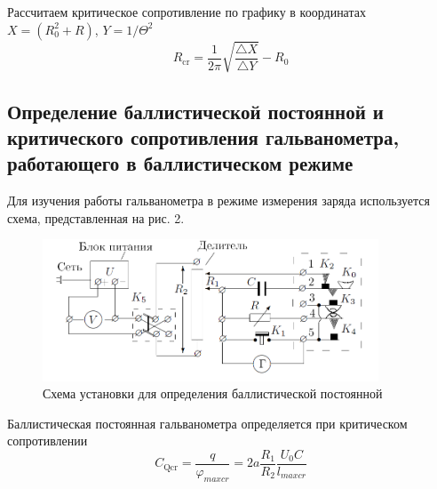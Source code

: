 \documentclass[a4paper]{article}
\begin{document}
Рассчитаем критическое сопротивление по графику в координатах $X = (R_0^2 + R)$, $Y = 1/\Theta^2$
\begin{equation}
    R_\text{cr} = \frac{1}{2\pi}\sqrt{\frac{\triangle X}{\triangle Y}} - R_0
\end{equation}

\subsection{Определение баллистической постоянной и критического сопротивления гальванометра, работающего в баллистическом режиме}

Для изучения работы гальванометра в режиме измерения заряда используется схема, представленная на рис. 2.

\begin{figure}[H]
    \centering
    \includegraphics[width=10cm]{fig1.PNG}
    \caption{Схема установки для определения баллистической постоянной}
    \label{fig:vac}
\end{figure}

Баллистическая постоянная гальванометра определяется при критическом сопротивлении
\begin{equation}
    C_\text{Qcr} = \frac{q}{\varphi_{max cr}} = 2a\frac{R_1}{R_2} \frac{U_0 C}{l_{max cr}}
\end{equation}
\end{document}
